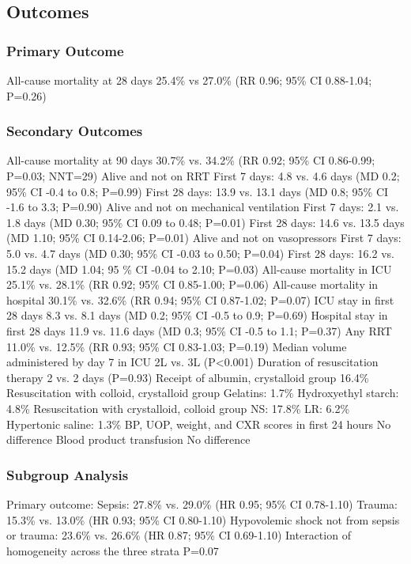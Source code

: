 \documentclass{beamer}
\begin{document}
\subsection{Outcomes}
\begin{frame}
	\frametitle{Primary Outcome}
All-cause mortality at 28 days
25.4\% vs 27.0\% (RR 0.96; 95\% CI 0.88-1.04; P=0.26)
\end{frame}
	\begin{frame}
		\frametitle{Secondary Outcomes}
All-cause mortality at 90 days
30.7\% vs. 34.2\% (RR 0.92; 95\% CI 0.86-0.99; P=0.03; NNT=29)
Alive and not on RRT
First 7 days: 4.8 vs. 4.6 days (MD 0.2; 95\% CI -0.4 to 0.8; P=0.99)
First 28 days: 13.9 vs. 13.1 days (MD 0.8; 95\% CI -1.6 to 3.3; P=0.90)
Alive and not on mechanical ventilation
First 7 days: 2.1 vs. 1.8 days (MD 0.30; 95\% CI 0.09 to 0.48; P=0.01)
First 28 days: 14.6 vs. 13.5 days (MD 1.10; 95\% CI 0.14-2.06; P=0.01)
Alive and not on vasopressors
First 7 days: 5.0 vs. 4.7 days (MD 0.30; 95\% CI -0.03 to 0.50; P=0.04)
First 28 days: 16.2 vs. 15.2 days (MD 1.04; 95 \% CI -0.04 to 2.10; P=0.03)
All-cause mortality in ICU
25.1\% vs. 28.1\% (RR 0.92; 95\% CI 0.85-1.00; P=0.06)
All-cause mortality in hospital
30.1\% vs. 32.6\% (RR 0.94; 95\% CI 0.87-1.02; P=0.07)
ICU stay in first 28 days
8.3 vs. 8.1 days (MD 0.2; 95\% CI -0.5 to 0.9; P=0.69)
Hospital stay in first 28 days
11.9 vs. 11.6 days (MD 0.3; 95\% CI -0.5 to 1.1; P=0.37)
Any RRT
11.0\% vs. 12.5\% (RR 0.93; 95\% CI 0.83-1.03; P=0.19)
Median volume administered by day 7 in ICU
2L vs. 3L (P<0.001)
Duration of resuscitation therapy
2 vs. 2 days (P=0.93)
Receipt of albumin, crystalloid group
16.4\%
Resuscitation with colloid, crystalloid group
Gelatins: 1.7\%
Hydroxyethyl starch: 4.8\%
Resuscitation with crystalloid, colloid group
NS: 17.8\%
LR: 6.2\%
Hypertonic saline: 1.3\%
BP, UOP, weight, and CXR scores in first 24 hours
No difference
Blood product transfusion
No difference
	\end{frame}

	\begin{frame}
		\frametitle{Subgroup Analysis}
Primary outcome:
Sepsis: 27.8\% vs. 29.0\% (HR 0.95; 95\% CI 0.78-1.10)
Trauma: 15.3\% vs. 13.0\% (HR 0.93; 95\% CI 0.80-1.10)
Hypovolemic shock not from sepsis or trauma: 23.6\% vs. 26.6\% (HR 0.87; 95\% CI 0.69-1.10)
Interaction of homogeneity across the three strata P=0.07
	\end{frame}
\end{document}
